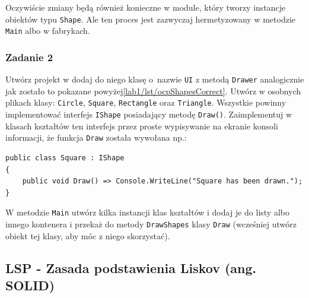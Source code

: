 

Oczywiście zmiany będą również konieczne w module, który tworzy instancje obiektów typu \texttt{Shape}. Ale ten proces jest zazwyczaj hermetyzowany w metodzie \texttt{Main} albo w fabrykach.

\subsubsection{Zadanie 2}
Utwórz projekt w dodaj do niego klasę o~nazwie \texttt{UI} z metodą \texttt{Drawer} analogicznie jak zostało to pokazane powyżej\ref{lab1/lst/ocpShapesCorrect}. Utwórz w osobnych plikach klasy: \texttt{Circle}, \texttt{Square}, \texttt{Rectangle} oraz \texttt{Triangle}. Wszystkie powinny implementować interfejs \texttt{IShape} posiadający metodę \texttt{Draw()}. Zaimplementuj w klasach kształtów ten interfejs przez proste wypisywanie na ekranie konsoli informacji, że funkcja \texttt{Draw} została wywołana np.:
\begin{lstlisting}
public class Square : IShape
{
	public void Draw() => Console.WriteLine("Square has been drawn.");
}
\end{lstlisting}
W metodzie \texttt{Main} utwórz kilka instancji klas kształtów i dodaj je do listy albo innego kontenera i przekaż do metody \texttt{DrawShapes} klasy \texttt{Draw} (wcześniej utwórz obiekt tej klasy, aby móc z niego skorzystać).

\subsection{LSP - Zasada podstawienia Liskov (ang. SO\textbf{L}ID)}

